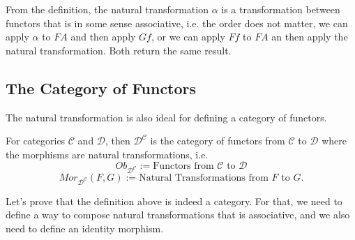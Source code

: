 From the definition, the natural transformation $\alpha$ is a transformation between functors
that is in some sense associative, i.e. the order does not matter, we can apply $\alpha$
to $FA$ and then apply $Gf$, or we can apply $Ff$ to $FA$ an then apply the natural transformation. Both
return the same result.

\subsection{The Category of Functors}

The natural transformation is also ideal for defining a category of functors.

\begin{definition}
  For categories $\mathcal C$ and $\mathcal D$, then $\mathcal D^{\mathcal C}$ is the category
  of functors from $\mathcal C$ to $\mathcal D$ where the morphisms are natural transformations,
  i.e.
  \begin{displaymath}
    Ob_{\mathcal D^{\mathcal C}} :={\text{Functors from } \mathcal C \text{ to } \mathcal D}
  \end{displaymath}
  \begin{displaymath}
    Mor_{\mathcal D^{\mathcal C}}(F,G) :={\text{Natural Transformations from } 
    F \text{ to } G}.
  \end{displaymath}
\end{definition}

Let's prove that the definition above is indeed a category.
For that, we need to define a way to compose natural transformations that
is associative, and we also need to define an identity morphism.

